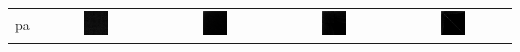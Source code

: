 \documentclass{article}
\begin{document}
\begin{table}[h]
\begin{tabular}{l | c c c c}
\hline
pa
&
    \includegraphics[width=0.23\textwidth]{../img/pa/adjacency-matrix-random-ordering.png}
& 
    \includegraphics[width=0.23\textwidth]{../img/pa/adjacency-matrix-given-ordering.png}
& 
    \includegraphics[width=0.23\textwidth]{../img/pa/adjacency-matrix-degree-ordering.png}
& 
    \includegraphics[width=0.23\textwidth]{../img/pa/adjacency-matrix-slashburn-ordering.png} \\


\end{tabular}
\end{table}
\end{document}
